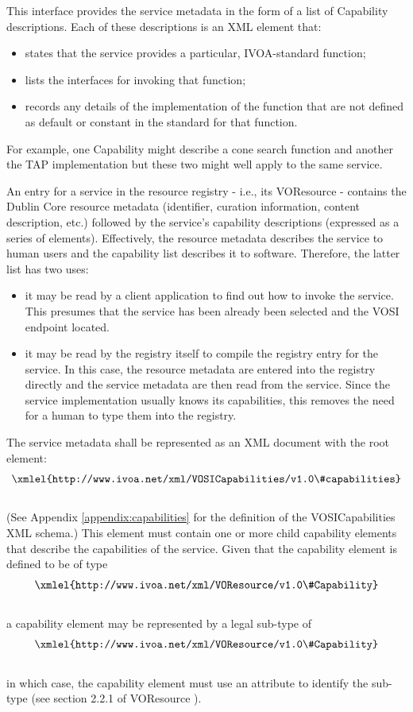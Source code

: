 \documentclass[11pt,letter]{ivoa}
\begin{document}
This interface provides the service metadata in the form of a list of Capability descriptions. Each of these descriptions is an XML element that:

\begin{itemize}
\item states that the service provides a particular, IVOA-standard function;
\item lists the interfaces for invoking that function;
\item records any details of the implementation of the function that are not defined as default or constant in the standard for that function. 
\end{itemize}

For example, one Capability might describe a cone search function and another the TAP implementation but these two might well apply to the same service.

An entry for a service in the resource registry - i.e., its VOResource - contains the Dublin Core resource metadata (identifier, curation information, content description, etc.) followed by the service's capability descriptions (expressed as a series of  elements). Effectively, the resource metadata describes the service to human users and the capability list describes it to software. Therefore, the latter list has two uses:

\begin{itemize}
\item it may be read by a client application to find out how to invoke the service. This presumes that the service has been already been selected and the VOSI endpoint located.
\item it may be read by the registry itself to compile the registry entry for the service. In this case, the resource metadata are entered into the registry directly and the service metadata are then read from the service. Since the service implementation usually knows its capabilities, this removes the need for a human to type them into the registry. 
\end{itemize}

The service metadata shall be represented as an XML document with the root element:\\
$$\hbox{\xmlel{http://www.ivoa.net/xml/VOSICapabilities/v1.0\#capabilities}}$$\\
(See Appendix \ref{appendix:capabilities} for the definition of the VOSICapabilities XML schema.) This element must contain one or more child capability elements that describe the capabilities of the service. Given that the capability element is defined to be of type\\
$$\hbox{\xmlel{http://www.ivoa.net/xml/VOResource/v1.0\#Capability}}$$\\
a capability element may be represented by a legal sub-type of\\
$$\hbox{\xmlel{http://www.ivoa.net/xml/VOResource/v1.0\#Capability}}$$\\
in which case, the capability element must use an  attribute to identify the sub-type (see section 2.2.1 of VOResource \citep{std:VOR}). 
\end{document}
